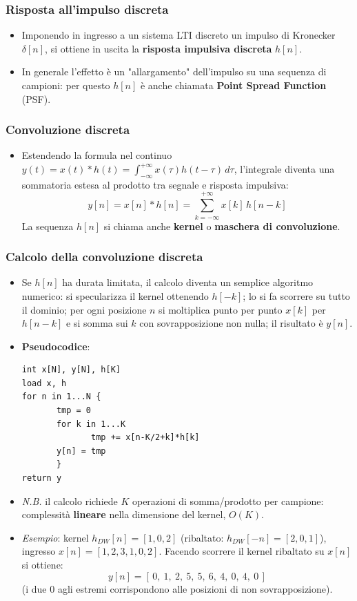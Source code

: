 \documentclass[12pt, a4paper]{article}
\begin{document}
\subsubsection{Risposta all'impulso discreta}
\begin{itemize}
    \item Imponendo in ingresso a un sistema LTI discreto un impulso di Kronecker $\delta[n]$, si ottiene in uscita la \textbf{risposta impulsiva discreta} $h[n]$.
    \item In generale l'effetto è un "allargamento" dell'impulso su una sequenza di campioni: per questo $h[n]$ è anche chiamata \textbf{Point Spread Function} (PSF).
\end{itemize}

\subsubsection{Convoluzione discreta}
\begin{itemize}
    \item Estendendo la formula nel continuo $y(t)=x(t)*h(t)=\int_{-\infty}^{+\infty}x(\tau)h(t-\tau)\,d\tau$, l'integrale diventa una sommatoria estesa al prodotto tra segnale e risposta impulsiva:
    $$y[n]=x[n]*h[n]=\sum_{k=-\infty}^{+\infty} x[k]\,h[n-k]$$
    La sequenza $h[n]$ si chiama anche \textbf{kernel} o \textbf{maschera di convoluzione}.
\end{itemize}

\subsubsection{Calcolo della convoluzione discreta}
\begin{itemize}
    \item Se $h[n]$ ha durata limitata, il calcolo diventa un semplice algoritmo numerico: si specularizza il kernel ottenendo $h[-k]$; lo si fa scorrere su tutto il dominio; per ogni posizione $n$ si moltiplica punto per punto $x[k]$ per $h[n-k]$ e si somma sui $k$ con sovrapposizione non nulla; il risultato è $y[n]$.
    \item \textbf{Pseudocodice}:
    \begin{verbatim}
int x[N], y[N], h[K]
load x, h
for n in 1...N {
       tmp = 0
       for k in 1...K
              tmp += x[n-K/2+k]*h[k]
       y[n] = tmp
       }
return y
    \end{verbatim}
    \item[] \textit{N.B.} il calcolo richiede $K$ operazioni di somma/prodotto per campione: complessità \textbf{lineare} nella dimensione del kernel, $O(K)$.
    \item \textit{Esempio}: kernel $h_{DW}[n]=[1,0,2]$ (ribaltato: $h_{DW}[-n]=[2,0,1]$), ingresso $x[n]=[1,2,3,1,0,2]$. Facendo scorrere il kernel ribaltato su $x[n]$ si ottiene:
    $$y[n] = [\,0,\ 1,\ 2,\ 5,\ 5,\ 6,\ 4,\ 0,\ 4,\ 0\,]$$
    (i due $0$ agli estremi corrispondono alle posizioni di non sovrapposizione).
\end{itemize}
\end{document}
